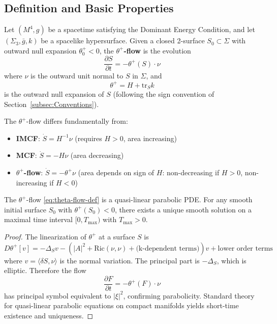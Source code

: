 \subsection{Definition and Basic Properties}
\label{subsec:theta-flow-definition}

\begin{definition}
\label{def:theta-plus-flow}
Let $(M^4, g)$ be a spacetime satisfying the Dominant Energy Condition, and let $(\Sigma_3, \bar{g}, k)$ be a spacelike hypersurface. Given a closed 2-surface $S_0 \subset \Sigma$ with outward null expansion $\theta^+_0 < 0$, the \textbf{$\theta^+$-flow} is the evolution
\begin{equation}
\frac{\partial S}{\partial t} = -\theta^+(S) \cdot \nu
\label{eq:theta-flow-def}
\end{equation}
where $\nu$ is the outward unit normal to $S$ in $\Sigma$, and
\begin{equation}
\theta^+ = H + \mathrm{tr}_S k
\end{equation}
is the outward null expansion of $S$ (following the sign convention of Section~\ref{subsec:Conventions}).
\end{definition}

\begin{remark}
The $\theta^+$-flow differs fundamentally from:
\begin{itemize}
\item \textbf{IMCF}: $\dot{S} = H^{-1}\nu$ (requires $H > 0$, area increasing)
\item \textbf{MCF}: $\dot{S} = -H\nu$ (area decreasing)
\item \textbf{$\theta^+$-flow}: $\dot{S} = -\theta^+\nu$ (area depends on sign of $H$: non-decreasing if $H > 0$, non-increasing if $H < 0$)
\end{itemize}
\end{remark}

\begin{proposition}
\label{prop:theta-flow-wellposed}
The $\theta^+$-flow \eqref{eq:theta-flow-def} is a quasi-linear parabolic PDE. For any smooth initial surface $S_0$ with $\theta^+(S_0) < 0$, there exists a unique smooth solution on a maximal time interval $[0, T_{\max})$ with $T_{\max} > 0$.
\end{proposition}

\begin{proof}
The linearization of $\theta^+$ at a surface $S$ is
\begin{equation}
D\theta^+[v] = -\Delta_S v - \left(|A|^2 + \mathrm{Ric}(\nu,\nu) + \text{(k-dependent terms)}\right)v + \text{lower order terms}
\end{equation}
where $v = \langle \delta S, \nu \rangle$ is the normal variation. The principal part is $-\Delta_S$, which is elliptic. Therefore the flow
\begin{equation}
\frac{\partial F}{\partial t} = -\theta^+(F) \cdot \nu
\end{equation}
has principal symbol equivalent to $|\xi|^2$, confirming parabolicity. Standard theory for quasi-linear parabolic equations on compact manifolds yields short-time existence and uniqueness.
\end{proof}

